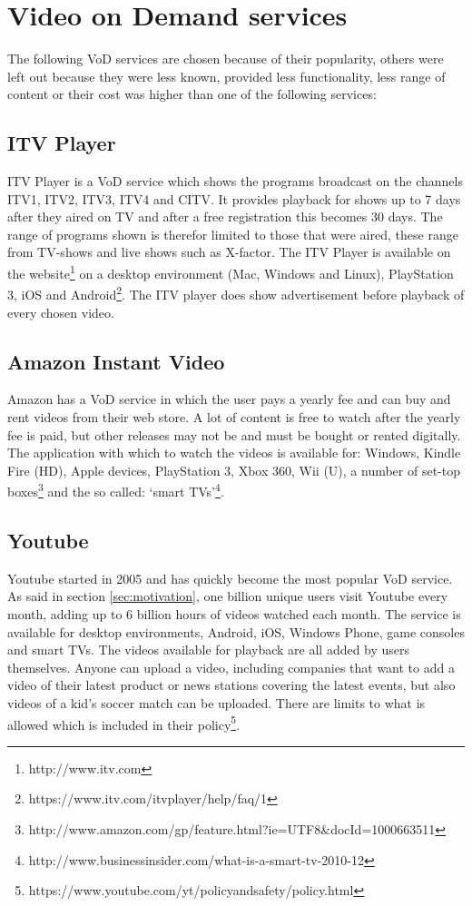 \section{Video on Demand services}
\label{sec:vodserv}
The following VoD services are chosen because of their popularity, others were left out because they were less known, provided less functionality, less range of content or their cost was higher than one of the following services:

\subsection{ITV Player}
ITV Player is a VoD service which shows the programs broadcast on the channels ITV1, ITV2, ITV3, ITV4 and CITV. It provides playback for shows up to 7 days after they aired on TV and after a free registration this becomes 30 days. The range of programs shown is therefor limited to those that were aired, these range from TV-shows and live shows such as X-factor. The ITV Player is available on the website\footnote{http://www.itv.com} on a desktop environment (Mac, Windows and Linux), PlayStation 3, iOS and Android\footnote{https://www.itv.com/itvplayer/help/faq/1}. The ITV player does show advertisement before playback of every chosen video.

\subsection{Amazon Instant Video}
Amazon has a VoD service in which the user pays a yearly fee and can buy and rent videos from their web store. A lot of content is free to watch after the yearly fee is paid, but other releases may not be and must be bought or rented digitally. The application with which to watch the videos is available for: Windows, Kindle Fire (HD), Apple devices, PlayStation 3, Xbox 360, Wii (U), a number of set-top boxes\footnote{http://www.amazon.com/gp/feature.html?ie=UTF8\&docId=1000663511} and the so called: `smart TVs'\footnote{http://www.businessinsider.com/what-is-a-smart-tv-2010-12}.

\subsection{Youtube}
Youtube started in 2005 and has quickly become the most popular VoD service. As said in section \ref{sec:motivation}, one billion unique users visit Youtube every month, adding up to 6 billion hours of videos watched each month. The service is available for desktop environments, Android, iOS, Windows Phone, game consoles and smart TVs. The videos available for playback are all added by users themselves. Anyone can upload a video, including companies that want to add a video of their latest product or news stations covering the latest events, but also videos of a kid's soccer match can be uploaded. There are limits to what is allowed which is included in their policy\footnote{https://www.youtube.com/yt/policyandsafety/policy.html}.

